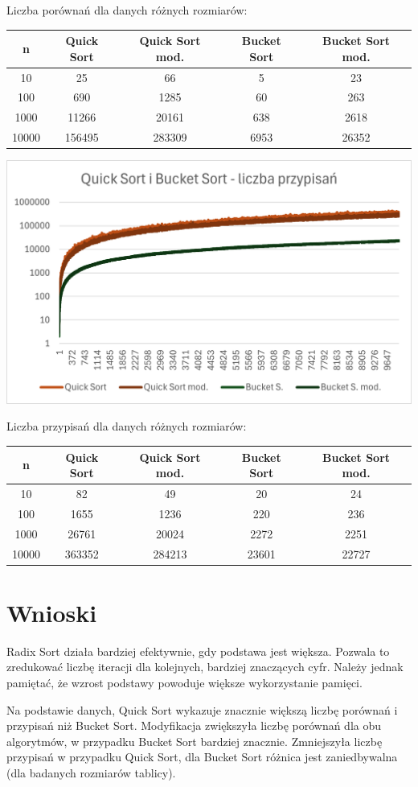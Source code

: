 \documentclass{article}
\begin{document}
\begin{center}
Liczba porównań dla danych różnych rozmiarów: 
\begin{tabular}{|c|c|c|c|c|}
 \hline
 n & Quick Sort & Quick Sort mod. & Bucket Sort & Bucket Sort mod. \\ 
 \hline
 10 & 25 & 66 & 5 & 23\\
 100 & 690 & 1285 & 60 & 263 \\
 1000 & 11266 & 20161 & 638 & 2618 \\
 10000 & 156495 & 283309 & 6953 & 26352 \\
 \hline
\end{tabular}
\end{center}

\begin{center}
    \includegraphics[width=1\textwidth]{QuickBucketPrzyp.png}
\end{center}

\begin{center}
Liczba przypisań dla danych różnych rozmiarów: 
\begin{tabular}{|c|c|c|c|c|}
 \hline
 n & Quick Sort & Quick Sort mod. & Bucket Sort & Bucket Sort mod. \\ 
 \hline
 10 & 82 & 49 & 20 & 24 \\
 100 & 1655 & 1236 & 220 & 236 \\
 1000 & 26761 & 20024 & 2272 & 2251 \\
 10000 & 363352 & 284213 & 23601 & 22727 \\
 \hline
\end{tabular}
\end{center}

\section{Wnioski}

Radix Sort działa bardziej efektywnie, gdy podstawa jest większa. Pozwala to zredukować liczbę iteracji dla kolejnych, bardziej znaczących cyfr. Należy jednak pamiętać, że wzrost podstawy powoduje większe wykorzystanie pamięci.

Na podstawie danych, Quick Sort wykazuje znacznie większą liczbę porównań i przypisań niż Bucket Sort. Modyfikacja zwiększyła liczbę porównań dla obu algorytmów, w przypadku Bucket Sort bardziej znacznie. Zmniejszyła liczbę przypisań w przypadku Quick Sort, dla Bucket Sort różnica jest zaniedbywalna (dla badanych rozmiarów tablicy).
\end{document}

